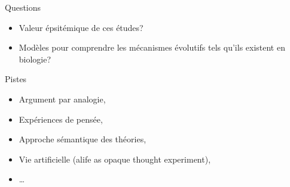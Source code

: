 \documentclass[8pt]{beamer}
\begin{document}
\begin{frame}
	
	\begin{alertblock}{Questions}
		\begin{itemize}
			\item Valeur épsitémique de ces études?
			\item Modèles pour comprendre les mécanismes évolutifs tels qu'ils existent en biologie?
		\end{itemize}
	\end{alertblock}

	\begin{block}{Pistes}
		\begin{itemize}
			\item Argument par analogie,
			\item Expériences de pensée,
			\item Approche sémantique des théories,
			\item Vie artificielle (alife as opaque thought experiment),
			\item \dots
		\end{itemize}
	\end{block}

	
\end{frame}

\begin{frame}
	
	
\end{frame}
\end{document}
